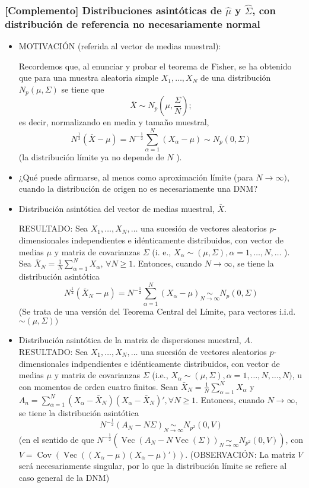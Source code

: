 \documentclass[11pt,a4paper]{article}
\begin{document}
\subsubsection{[Complemento] Distribuciones asintóticas de \texorpdfstring{$\hat{\mu}$}) y \texorpdfstring{$\hat{\Sigma}$}), con distribución de referencia no necesariamente normal}
\begin{itemize}
\item MOTIVACIÓN (referida al vector de medias muestral):

Recordemos que, al enunciar y probar el teorema de Fisher, se ha obtenido que para una muestra aleatoria simple $X_{1}, \ldots, X_{N}$ de una distribución $N_{p}(\mu, \Sigma)$ se tiene que
$$\overline{X} \sim N_{p}(\mu, \frac{\Sigma}{N});$$
es decir, normalizando en media y tamaño muestral,
$$N^{\frac{1}{2}}(\overline{X}-\mu)=N^{-\frac{1}{2}} \sum_{\alpha=1}^{N}(X_{\alpha}-\mu) \sim N_{p}(0, \Sigma)$$
(la distribución límite ya no depende de $N$ ).

\item ¿Qué puede afirmarse, al menos como aproximación límite (para $N \rightarrow \infty)$, cuando la distribución de origen no es necesariamente una DNM?

\item Distribución asintótica del vector de medias muestral, $\overline{X}$.

RESULTADO: Sea $X_{1}, \ldots, X_{N}, \ldots$ una sucesión de vectores aleatorios $p$-dimensionales independientes e idénticamente distribuidos, con vector de medias $\mu$ y matriz de covarianzas $\Sigma$ (i. e., $X_{\alpha} \sim(\mu, \Sigma), \alpha=1, \ldots, N, \ldots$ ). Sea $\overline{X}_{N}=\frac{1}{N} \sum_{\alpha=1}^{N} X_{\alpha}$, $\forall N \geq 1$. Entonces, cuando $N \to \infty$, se tiene la distribución asintótica
$$N^{\frac{1}{2}}(\overline{X}_{N}-\mu)=N^{-\frac{1}{2}} \sum_{\alpha=1}^{N}(X_{\alpha}-\mu) \underset{N \to \infty}{\sim} N_{p}(0, \Sigma)$$
(Se trata de una versión del Teorema Central del Límite, para vectores i.i.d. $\sim(\mu, \Sigma))$

\item Distribución asintótica de la matriz de dispersiones muestral, $A$. \\
RESULTADO: Sea $X_{1}, \dots, X_{N}, \dots$ una sucesión de vectores aleatorios $p$-dimensionales indpendientes e idénticamente distribuidos, con vector de medias $\mu$ y matriz de covarianzas $\Sigma$ (i.e., $X_{\alpha} \sim (\mu, \Sigma), \alpha = 1, \dots, N, \dots, N)$, u con momentos de orden cuatro finitos. Sean $\bar{X}_{N} = \frac{1}{N}\sum_{\alpha=1}^{N} X_{\alpha}$ y $A_{n} = \sum_{\alpha=1}^{N}(X_{\alpha} - \bar{X}_{N})(X_{\alpha} - \bar{X}_{N})', \forall N \geq 1$. Entonces, cuando $N \to \infty$, se tiene la distribución asintótica
$$N^{-\frac{1}{2}}(A_{N} - N\Sigma) \underset{N \to \infty}{\sim} N_{p^{2}}(0, V)$$
(en el sentido de que $N^{-\frac{1}{2}}(\operatorname{Vec}(A_{N} - N\operatorname{Vec}(\Sigma)) \underset{N \to \infty}{\sim} N_{p^{2}}(0, V))$, con $V = \operatorname{Cov}(\operatorname{Vec}((X_{\alpha} - \mu)(X_{\alpha} - \mu)'))$.
(OBSERVACIÓN: La matriz $V$ será necesariamente singular, por lo que la distribución límite se refiere al caso general de la DNM)
\end{itemize}
\end{document}
